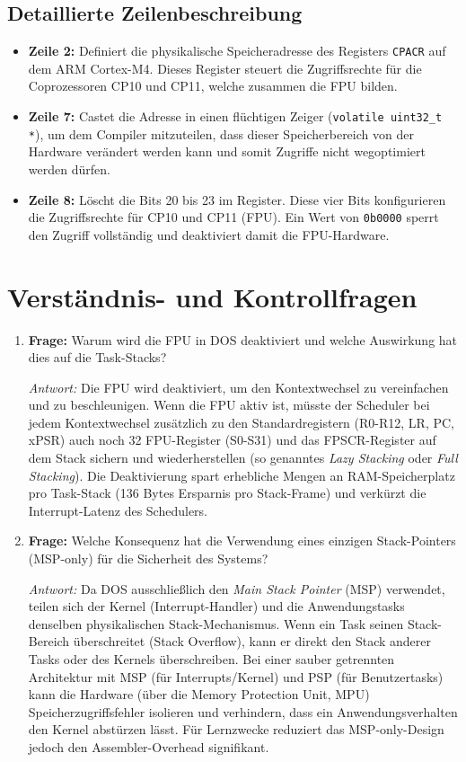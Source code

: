 \subsection{Detaillierte Zeilenbeschreibung}
\begin{itemize}
    \item \textbf{Zeile 2:} Definiert die physikalische Speicheradresse des Registers \lstinline|CPACR| auf dem ARM Cortex-M4. Dieses Register steuert die Zugriffsrechte für die Coprozessoren CP10 und CP11, welche zusammen die FPU bilden.
    \item \textbf{Zeile 7:} Castet die Adresse in einen flüchtigen Zeiger (\lstinline|volatile uint32_t *|), um dem Compiler mitzuteilen, dass dieser Speicherbereich von der Hardware verändert werden kann und somit Zugriffe nicht wegoptimiert werden dürfen.
    \item \textbf{Zeile 8:} Löscht die Bits 20 bis 23 im Register. Diese vier Bits konfigurieren die Zugriffsrechte für CP10 und CP11 (FPU). Ein Wert von \lstinline|0b0000| sperrt den Zugriff vollständig und deaktiviert damit die FPU-Hardware.
\end{itemize}

\section{Verständnis- und Kontrollfragen}
\begin{enumerate}
    \item \textbf{Frage:} Warum wird die FPU in DOS deaktiviert und welche Auswirkung hat dies auf die Task-Stacks?
    
    \textit{Antwort:} Die FPU wird deaktiviert, um den Kontextwechsel zu vereinfachen und zu beschleunigen. Wenn die FPU aktiv ist, müsste der Scheduler bei jedem Kontextwechsel zusätzlich zu den Standardregistern (R0-R12, LR, PC, xPSR) auch noch 32 FPU-Register (S0-S31) und das FPSCR-Register auf dem Stack sichern und wiederherstellen (so genanntes \textit{Lazy Stacking} oder \textit{Full Stacking}). Die Deaktivierung spart erhebliche Mengen an RAM-Speicherplatz pro Task-Stack (136 Bytes Ersparnis pro Stack-Frame) und verkürzt die Interrupt-Latenz des Schedulers.
    
    \item \textbf{Frage:} Welche Konsequenz hat die Verwendung eines einzigen Stack-Pointers (MSP-only) für die Sicherheit des Systems?
    
    \textit{Antwort:} Da DOS ausschließlich den \textit{Main Stack Pointer} (MSP) verwendet, teilen sich der Kernel (Interrupt-Handler) und die Anwendungstasks denselben physikalischen Stack-Mechanismus. Wenn ein Task seinen Stack-Bereich überschreitet (Stack Overflow), kann er direkt den Stack anderer Tasks oder des Kernels überschreiben. Bei einer sauber getrennten Architektur mit MSP (für Interrupts/Kernel) und PSP (für Benutzertasks) kann die Hardware (über die Memory Protection Unit, MPU) Speicherzugriffsfehler isolieren und verhindern, dass ein Anwendungsverhalten den Kernel abstürzen lässt. Für Lernzwecke reduziert das MSP-only-Design jedoch den Assembler-Overhead signifikant.
\end{enumerate}
